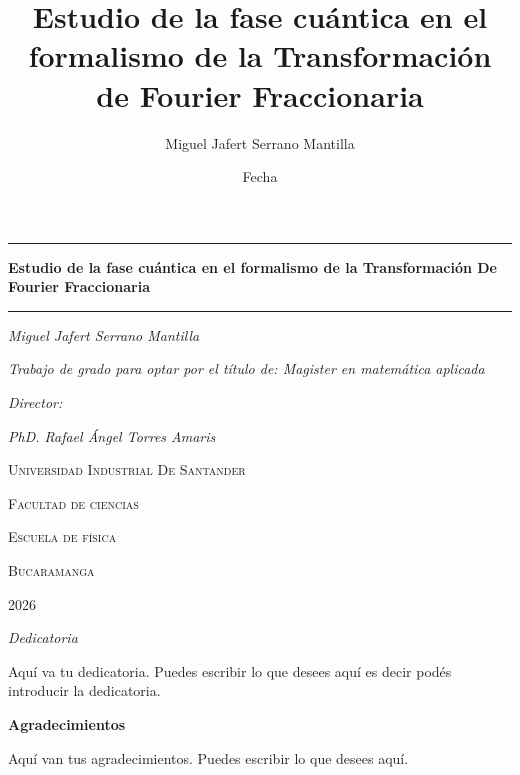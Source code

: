 \documentclass[letterpaper]{report}
\title{Estudio de la fase cuántica en el formalismo de la Transformación de Fourier Fraccionaria}
\author{Miguel Jafert Serrano Mantilla}
\date{Fecha}
\begin{document}
\begin{titlepage}
    \centering
    \vspace{5cm}
    \rule{\textwidth}{2pt}
    {\huge\bfseries Estudio de la fase cuántica en el formalismo de la Transformación De Fourier Fraccionaria\par}
    \rule{\textwidth}{2pt}
    \vfill
    {\Large\itshape Miguel Jafert Serrano Mantilla\par}
    \vspace{3cm}
    {\Large\itshape Trabajo de grado para optar por el título de: Magister en matemática aplicada \par}
    \vspace{1 cm}
    {\Large\itshape Director:  \par}
    {\Large\itshape PhD. Rafael Ángel Torres Amaris \par}
    \vspace{0.5cm}
    \vfill
    \vspace{1cm}
    {\scshape\Large Universidad Industrial De Santander \par}
    {\scshape\Large Facultad de ciencias \par}
    {\scshape\Large Escuela de física \par}
    {\scshape\Large Bucaramanga \par}
    {\scshape\Large 2026 \par}
\end{titlepage}

\cleardoublepage

\thispagestyle{empty}
\vspace*{\fill}
\begin{flushright}
    {\Large\itshape Dedicatoria\par}
    \vspace{0.5cm}
    Aquí va tu dedicatoria. Puedes escribir lo que desees aquí es decir podés introducir la dedicatoria.
\end{flushright}
\vspace*{\fill}
\clearpage

\thispagestyle{empty}
\vspace*{\fill}
\begin{flushleft}
    {\huge\bfseries Agradecimientos\par}
    \vspace{0.5cm}
    Aquí van tus agradecimientos. Puedes escribir lo que desees aquí.
\end{flushleft}
\vspace*{\fill}
\clearpage
\end{document}
